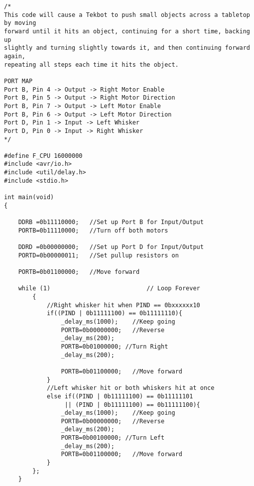 \documentclass[12pt,letterpaper]{article}
\begin{document}
\begin{verbatim}
/*
This code will cause a Tekbot to push small objects across a tabletop by moving
forward until it hits an object, continuing for a short time, backing up
slightly and turning slightly towards it, and then continuing forward again,
repeating all steps each time it hits the object.

PORT MAP
Port B, Pin 4 -> Output -> Right Motor Enable
Port B, Pin 5 -> Output -> Right Motor Direction
Port B, Pin 7 -> Output -> Left Motor Enable
Port B, Pin 6 -> Output -> Left Motor Direction
Port D, Pin 1 -> Input -> Left Whisker
Port D, Pin 0 -> Input -> Right Whisker
*/

#define F_CPU 16000000
#include <avr/io.h>
#include <util/delay.h>
#include <stdio.h>

int main(void)
{

    DDRB =0b11110000;   //Set up Port B for Input/Output
    PORTB=0b11110000;   //Turn off both motors

    DDRD =0b00000000;   //Set up Port D for Input/Output
    PORTD=0b00000011;   //Set pullup resistors on

    PORTB=0b01100000;   //Move forward
    
    while (1)                           // Loop Forever
        {
            //Right whisker hit when PIND == 0bxxxxxx10
            if((PIND | 0b11111100) == 0b11111110){
                _delay_ms(1000);    //Keep going
                PORTB=0b00000000;   //Reverse
                _delay_ms(200);
                PORTB=0b01000000; //Turn Right
                _delay_ms(200);

                PORTB=0b01100000;   //Move forward
            }
            //Left whisker hit or both whiskers hit at once
            else if((PIND | 0b11111100) == 0b11111101
                 || (PIND | 0b11111100) == 0b11111100){
                _delay_ms(1000);    //Keep going
                PORTB=0b00000000;   //Reverse
                _delay_ms(200);
                PORTB=0b00100000; //Turn Left
                _delay_ms(200);
                PORTB=0b01100000;   //Move forward
            }
        };
    }
\end{verbatim}
\end{document}
